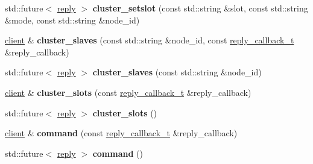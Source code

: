\begin{DoxyCompactItemize}
\item 
\mbox{\label{classcpp__redis_1_1client_a824c1234198e48badeccf4190b610e32}} 
std\+::future$<$ \hyperlink{classcpp__redis_1_1reply}{reply} $>$ {\bfseries cluster\+\_\+setslot} (const std\+::string \&slot, const std\+::string \&mode, const std\+::string \&node\+\_\+id)
\item 
\mbox{\label{classcpp__redis_1_1client_ac03fb62a9eb5abbb5248bc38fd4dfb5e}} 
\hyperlink{classcpp__redis_1_1client}{client} \& {\bfseries cluster\+\_\+slaves} (const std\+::string \&node\+\_\+id, const \hyperlink{classcpp__redis_1_1client_a061a1140d36d2eaeda82b09a0bb3f9f2}{reply\+\_\+callback\+\_\+t} \&reply\+\_\+callback)
\item 
\mbox{\label{classcpp__redis_1_1client_afbfca7fb91f492768c7ac75677f433a2}} 
std\+::future$<$ \hyperlink{classcpp__redis_1_1reply}{reply} $>$ {\bfseries cluster\+\_\+slaves} (const std\+::string \&node\+\_\+id)
\item 
\mbox{\label{classcpp__redis_1_1client_a7d0dad34ca2fe2e301b202388bb47e10}} 
\hyperlink{classcpp__redis_1_1client}{client} \& {\bfseries cluster\+\_\+slots} (const \hyperlink{classcpp__redis_1_1client_a061a1140d36d2eaeda82b09a0bb3f9f2}{reply\+\_\+callback\+\_\+t} \&reply\+\_\+callback)
\item 
\mbox{\label{classcpp__redis_1_1client_a9dc222141ab85da05efbce7a7ff0a7d1}} 
std\+::future$<$ \hyperlink{classcpp__redis_1_1reply}{reply} $>$ {\bfseries cluster\+\_\+slots} ()
\item 
\mbox{\label{classcpp__redis_1_1client_accac4fab4be3f71b94fc0aa02496f6a3}} 
\hyperlink{classcpp__redis_1_1client}{client} \& {\bfseries command} (const \hyperlink{classcpp__redis_1_1client_a061a1140d36d2eaeda82b09a0bb3f9f2}{reply\+\_\+callback\+\_\+t} \&reply\+\_\+callback)
\item 
\mbox{\label{classcpp__redis_1_1client_a93ef2e84647990d02aa67a1e22341b38}} 
std\+::future$<$ \hyperlink{classcpp__redis_1_1reply}{reply} $>$ {\bfseries command} ()
\item 
\mbox{\label{classcpp__redis_1_1client_a639c7fd5c7899ba474e65513ee337bea}} 

\end{DoxyCompactItemize}
